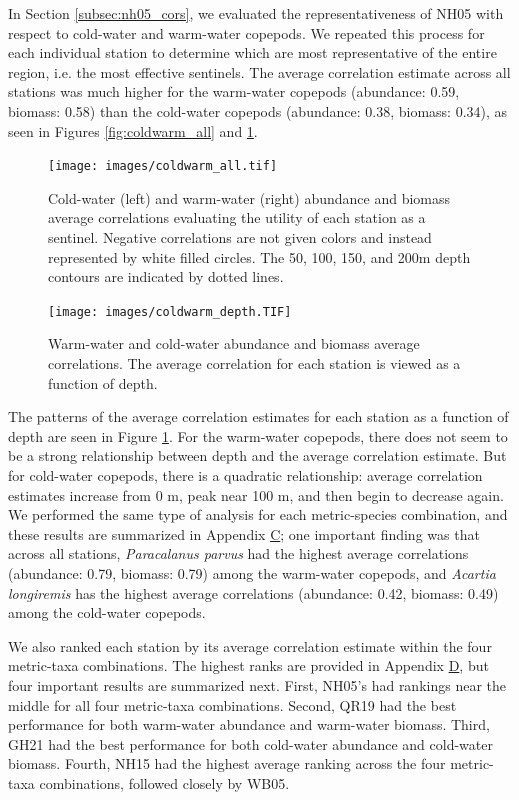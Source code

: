 \documentclass[preprint, authoryear, 12pt]{elsarticle}
\begin{document}
In Section \ref{subsec:nh05_cors}, we evaluated the representativeness of NH05 with respect to cold-water and warm-water copepods. We repeated this process for each individual station to determine which are most representative of the entire region, i.e. the most effective sentinels. The average correlation estimate across all stations was much higher for the warm-water copepods (abundance: 0.59, biomass: 0.58) than the cold-water copepods (abundance: 0.38, biomass: 0.34), as seen in Figures \ref{fig:coldwarm_all} and \ref{fig:coldwarm_depth}.
\begin{figure}
\centering
  \texttt{[image: images/coldwarm\_all.tif]}
  \caption{Cold-water (left) and warm-water (right) abundance and biomass average correlations evaluating the utility of each station as a sentinel.  Negative correlations are not given colors and instead represented by white filled circles.  The 50, 100, 150, and 200m depth contours are indicated by dotted lines.}
  \label{fig:coldwarm_all}
    \texttt{[image: images/coldwarm\_depth.TIF]}
  \caption{Warm-water and cold-water abundance and biomass average correlations. The average correlation for each station is viewed as a function of depth.}
  \label{fig:coldwarm_depth}
\end{figure}
The patterns of the average correlation estimates for each station as a function of depth are seen in Figure \ref{fig:coldwarm_depth}. For the warm-water copepods, there does not seem to be a strong relationship between depth and the average correlation estimate.  But for cold-water copepods, there is a quadratic relationship: average correlation estimates increase from 0 m, peak near 100 m, and then begin to decrease again. We performed the same type of analysis for each metric-species combination, and these results are summarized in Appendix \hyperlink{appendixC}{C}; one important finding was that across all stations, \textit{Paracalanus parvus} had the highest average correlations (abundance: 0.79, biomass: 0.79) among the warm-water copepods, and \textit{Acartia longiremis} has the highest average correlations (abundance: 0.42, biomass: 0.49) among the cold-water copepods.

We also ranked each station by its average correlation estimate within the four metric-taxa combinations. The highest ranks are provided in Appendix \hyperlink{appendixD}{D}, but four important results are summarized next.  First, NH05’s had rankings near the middle for all four metric-taxa combinations. Second, QR19 had the best performance for both warm-water abundance and warm-water biomass.  Third, GH21 had the best performance for both cold-water abundance and cold-water biomass.  Fourth, NH15 had the highest average ranking across the four metric-taxa combinations, followed closely by WB05.  
\end{document}
